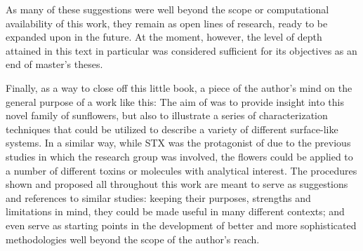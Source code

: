 As many of these suggestions were well beyond the scope or computational availability of this work, they remain as open lines of research, ready to be expanded upon in the future.
At the moment, however, the level of depth attained in this text in particular was considered sufficient for its objectives as an end of master's theses.

Finally, as a way to close off this little book, a piece of the author's mind on the general purpose of a work like this:
The aim of  was to provide insight into this novel family of sunflowers, but also to illustrate a series of characterization techniques that could be utilized to describe a variety of different surface-like systems.
In a similar way, while STX was the protagonist of  due to the previous studies in which the research group was involved, the flowers could be applied to a number of different toxins or molecules with analytical interest.
The procedures shown and proposed all throughout this work are meant to serve as suggestions and references to similar studies: keeping their purposes, strengths and limitations in mind, they could be made useful in many different contexts; and even serve as starting points in the development of better and more sophisticated methodologies well beyond the scope of the author's reach.
